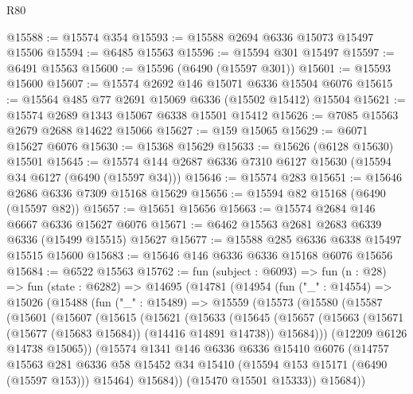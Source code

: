 \begin{lexlean}{R80}
\begin{coremodule}
@15588 := @15574 @354
@15593 := @15588 @2694 @6336 @15073 @15497 @15506
@15594 := @6485 @15563
@15596 := @15594 @301 @15497
@15597 := @6491 @15563
@15600 := @15596 (@6490 (@15597 @301))
@15601 := @15593 @15600
@15607 := @15574 @2692 @146 @15071 @6336 @15504 @6076
@15615 := @15564 @485 @77 @2691 @15069 @6336 (@15502 @15412) @15504
@15621 := @15574 @2689 @1343 @15067 @6338 @15501 @15412
@15626 := @7085 @15563 @2679 @2688 @14622 @15066
@15627 := @159 @15065
@15629 := @6071 @15627 @6076
@15630 := @15368 @15629
@15633 := @15626 (@6128 @15630) @15501
@15645 := @15574 @144 @2687 @6336 @7310 @6127 @15630 (@15594 @34 @6127 (@6490 (@15597 @34)))
@15646 := @15574 @283
@15651 := @15646 @2686 @6336 @7309 @15168 @15629
@15656 := @15594 @82 @15168 (@6490 (@15597 @82))
@15657 := @15651 @15656
@15663 := @15574 @2684 @146 @6667 @6336 @15627 @6076
@15671 := @6462 @15563 @2681 @2683 @6339 @6336 (@15499 @15515) @15627
@15677 := @15588 @285 @6336 @6338 @15497 @15515 @15600
@15683 := @15646 @146 @6336 @6336 @15168 @6076 @15656
@15684 := @6522 @15563
@15762 := fun (subject : @6093) =>
  fun (n : @28) =>
  fun (state : @6282) =>
  @14695
    (@14781
      (@14954
        (fun ("_" : @14554) =>
        @15026
          (@15488
            (fun ("_" : @15489) =>
            @15559
              (@15573
                (@15580
                  (@15587
                    (@15601
                      (@15607
                        (@15615
                          (@15621
                            (@15633
                              (@15645
                                (@15657
                                  (@15663
                                    (@15671 (@15677 (@15683 @15684)) (@14416 @14891 @14738))
                                    @15684)))
                              (@12209 @6126 @14738 @15065))
                            (@15574
                              @1341
                              @146
                              @6336
                              @6336
                              @15410
                              @6076
                              (@14757
                                @15563
                                @281
                                @6336
                                @58
                                @15452
                                @34
                                @15410
                                (@15594 @153 @15171 (@6490 (@15597 @153)))
                                @15464)
                              @15684))
                          (@15470 @15501 @15333))
                        @15684))

\end{coremodule}
\end{lexlean}
